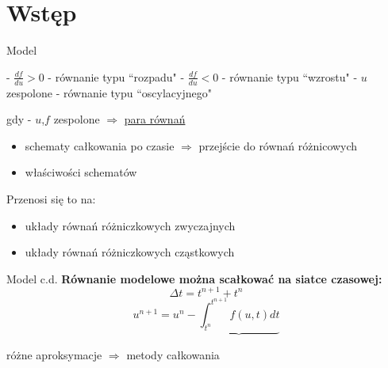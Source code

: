 \section{Wstęp}
\begin{frame}{Model}
  \begin{center}
  \end{center}

  - $\frac{df}{du} > 0$ - równanie typu ``rozpadu" \newline
  - $\frac{df}{du} < 0$ - równanie typu ``wzrostu" \newline
  - $u$ zespolone - równanie typu ``oscylacyjnego" \par
  \qquad\qquad gdy - $u$,$f$ zespolone $\Rightarrow$ \underline{para równań} \newline
  \begin{itemize}
    \item schematy całkowania po czasie $\Rightarrow$ przejście do równań różnicowych
    \item właściwości schematów
  \end{itemize}
  Przenosi się to na:
  \begin{itemize}
    \item układy równań różniczkowych zwyczajnych
    \item układy równań różniczkowych cząstkowych
  \end{itemize}
\end{frame}
\begin{frame}{Model c.d.}
  \textbf{Równanie modelowe można scałkować na siatce czasowej:}
  $$\Delta t = t^{n+1}+t^n$$
  $$u^{n+1} = u^n - \underbrace{\int_{t^n}^{t^{n+1}}f(u,t)dt}$$
  \begin{flushright}
    różne aproksymacje $\Rightarrow$ metody całkowania
  \end{flushright}
\end{frame}
